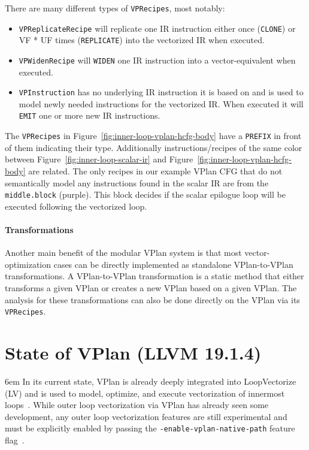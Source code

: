 \documentclass[sigplan,11pt,nonacm]{acmart}
\begin{document}
There are many different types of \texttt{VPRecipes}, most notably:
\begin{itemize}
  \item \texttt{VPReplicateRecipe} will replicate one IR instruction either once (\texttt{CLONE})
  or VF * UF times (\texttt{REPLICATE}) into the vectorized IR when executed.
  \item \texttt{VPWidenRecipe} will \texttt{WIDEN} one IR instruction into a
  vector-equivalent when executed.
  \item \texttt{VPInstruction} has no underlying IR instruction it is based on and is used 
  to model newly needed instructions for the vectorized IR. When executed it will 
  \texttt{EMIT} one or more new IR instructions.
\end{itemize}

The \texttt{VPRecipes} in Figure~\ref{fig:inner-loop-vplan-hcfg-body} have a \texttt{PREFIX}
in front of them indicating their type. Additionally instructions/recipes of the same color 
between Figure~\ref{fig:inner-loop-scalar-ir} and Figure~\ref{fig:inner-loop-vplan-hcfg-body}
are related. The only recipes in our example VPlan CFG that do not semantically model any 
instructions found in the scalar IR are from the \texttt{middle.block} (purple). 
This block decides if the scalar epilogue loop will be executed following the vectorized loop.

\paragraph{Transformations}
Another main benefit of the modular VPlan system is that most vector-optimization cases can 
be directly implemented as standalone VPlan-to-VPlan transformations. A VPlan-to-VPlan 
transformation is a static method that either transforms a given VPlan or creates a new 
VPlan based on a given VPlan. The analysis for these transformations can also be done 
directly on the VPlan via its \texttt{VPRecipes}.


\section{State of VPlan (LLVM 19.1.4)}
\emergencystretch 6em
In its current state, VPlan is already deeply integrated into LoopVectorize (LV) and is
used to model, optimize, and execute vectorization of innermost loops~\cite{llvmvplan,llvmintrvplan,llvmvplanupdate}. 
While outer loop vectorization via VPlan has already seen some development, any 
outer loop vectorization features are still experimental and must be explicitly enabled 
by passing the \texttt{-enable-\allowbreak vplan-\allowbreak native-\allowbreak path} 
feature flag~\cite{llvmouterloop,llvmouterloopstatus}.
\end{document}
